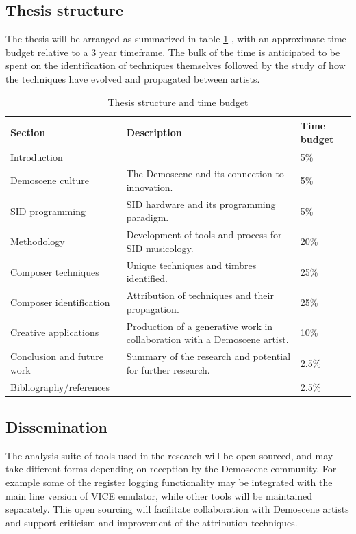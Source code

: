 \documentclass[10pt]{article}
\begin{document}
\begin{multicols*}{2}
\section{Thesis structure}

The thesis will be arranged as summarized in table \ref{table:timebudget} , with an approximate time budget relative to a 3 year timeframe. The bulk of the time is anticipated to be spent on the identification of techniques themselves followed by the study of how the techniques have evolved and propagated between artists.

\begin{table}[htb]
  \begin{tabular}{|l|l|l|}
        \hline
        Section & Description & Time budget \\
        \hline
        Introduction &  & 5\% \\
        \hline
        Demoscene culture & The Demoscene and its connection to innovation. & 5\% \\
        \hline
        SID programming & SID hardware and its programming paradigm. & 5\% \\
        \hline
        Methodology & Development of tools and process for SID musicology. & 20\% \\
        \hline
        Composer techniques & Unique techniques and timbres identified. & 25\% \\
        \hline
        Composer identification & Attribution of techniques and their propagation. & 25\% \\
        \hline
        Creative applications & Production of a generative work in collaboration with a Demoscene artist.  & 10\% \\
        \hline
        Conclusion and future work & Summary of the research and potential for further research. & 2.5\% \\
        \hline
        Bibliography/references &  & 2.5\% \\
        \hline
  \end{tabular}
  \caption{Thesis structure and time budget}
  \label{table:timebudget}
\end{table}


  \subsection{Dissemination}

  The analysis suite of tools used in the research will be open sourced, and may take different forms depending on reception by the Demoscene community. For example some of the register logging functionality may be integrated with the main line version of VICE emulator, while other tools will be maintained separately. This open sourcing will facilitate collaboration with Demoscene artists and support criticism and improvement of the attribution techniques.


\end{multicols*}
\end{document}
